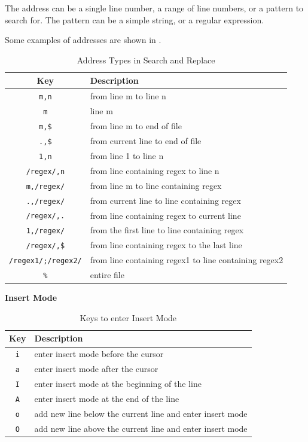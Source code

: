The address can be a single line number, a range of line numbers,
or a pattern to search for. The pattern can be a simple string,
or a regular expression.

Some examples of addresses are shown in .

\begin{table}[h!]
  \caption{Address Types in Search and Replace}
  \begin{tabular}{c l}
    \toprule
    Key & Description \\
    \midrule
    \texttt{m,n} & from line m to line n \\
    \texttt{m} & line m \\
    \texttt{m,\$} & from line m to end of file \\
    \texttt{.,\$} & from current line to end of file \\
    \texttt{1,n} & from line 1 to line n \\
    \texttt{/regex/,n} & from line containing regex to line n \\
    \texttt{m,/regex/} & from line m to line containing regex \\
    \texttt{.,/regex/} & from current line to line containing regex \\
    \texttt{/regex/,.} & from line containing regex to current line \\
    \texttt{1,/regex/} & from the first line to line containing regex \\
    \texttt{/regex/,\$} & from line containing regex to the last line \\
    \texttt{/regex1/;/regex2/} & from line containing regex1 to line containing regex2 \\
    \texttt{\%} & entire file \\
    \bottomrule
  \end{tabular}
\end{table}

\textbf{Insert Mode}

\begin{table}[h!]
  \caption{Keys to enter Insert Mode}
  \begin{tabular}{c l}
    \toprule
    Key & Description \\
    \midrule
    \texttt{i} & enter insert mode before the cursor \\
    \texttt{a} & enter insert mode after the cursor \\
    \texttt{I} & enter insert mode at the beginning of the line \\
    \texttt{A} & enter insert mode at the end of the line \\
    \texttt{o} & add new line below the current line and enter insert mode \\
    \texttt{O} & add new line above the current line and enter insert mode \\
    \bottomrule
  \end{tabular}
\end{table}


